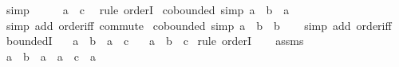\begin{isabellebody}
\ simp\isanewline
\ \ \isamarkupfalse%
\ \isamarkupfalse%
\ {\isachardoublequoteopen}a\ \isactrlbold {\isasymle}\ c{\isachardoublequoteclose}\ \isamarkupfalse%
\ {\isacharparenleft}{\kern0pt}rule\ orderI{\isacharparenright}{\kern0pt}\isanewline
{}\isamarkupfalse%
%
\endisatagproof
{\isafoldproof}%
%
\isadelimproof
\isanewline
%
\endisadelimproof
\isanewline
{}\isamarkupfalse%
\ cobounded{}\ {\isacharbrackleft}{\kern0pt}simp{\isacharbrackright}{\kern0pt}{\isacharcolon}{\kern0pt}\ {\isachardoublequoteopen}a\ \isactrlbold {\isacharasterisk}{\kern0pt}\ b\ \isactrlbold {\isasymle}\ a{\isachardoublequoteclose}\isanewline
%
\isadelimproof
\ \ %
\endisadelimproof
%
\isatagproof
{}\isamarkupfalse%
\ {\isacharparenleft}{\kern0pt}simp\ add{\isacharcolon}{\kern0pt}\ order{\isacharunderscore}{\kern0pt}iff\ commute{\isacharparenright}{\kern0pt}%
\endisatagproof
{\isafoldproof}%
%
\isadelimproof
\isanewline
%
\endisadelimproof
\isanewline
{}\isamarkupfalse%
\ cobounded{}\ {\isacharbrackleft}{\kern0pt}simp{\isacharbrackright}{\kern0pt}{\isacharcolon}{\kern0pt}\ {\isachardoublequoteopen}a\ \isactrlbold {\isacharasterisk}{\kern0pt}\ b\ \isactrlbold {\isasymle}\ b{\isachardoublequoteclose}\isanewline
%
\isadelimproof
\ \ %
\endisadelimproof
%
\isatagproof
{}\isamarkupfalse%
\ {\isacharparenleft}{\kern0pt}simp\ add{\isacharcolon}{\kern0pt}\ order{\isacharunderscore}{\kern0pt}iff{\isacharparenright}{\kern0pt}%
\endisatagproof
{\isafoldproof}%
%
\isadelimproof
\isanewline
%
\endisadelimproof
\isanewline
{}\isamarkupfalse%
\ boundedI{\isacharcolon}{\kern0pt}\isanewline
\ \ \ {\isachardoublequoteopen}a\ \isactrlbold {\isasymle}\ b{\isachardoublequoteclose}\ \ {\isachardoublequoteopen}a\ \isactrlbold {\isasymle}\ c{\isachardoublequoteclose}\isanewline
\ \ \ {\isachardoublequoteopen}a\ \isactrlbold {\isasymle}\ b\ \isactrlbold {\isacharasterisk}{\kern0pt}\ c{\isachardoublequoteclose}\isanewline
%
\isadelimproof
%
\endisadelimproof
%
\isatagproof
{}\isamarkupfalse%
\ {\isacharparenleft}{\kern0pt}rule\ orderI{\isacharparenright}{\kern0pt}\isanewline
\ \ \isamarkupfalse%
\ assms\ \isamarkupfalse%
\ {\isachardoublequoteopen}a\ \isactrlbold {\isacharasterisk}{\kern0pt}\ b\ {\isacharequal}{\kern0pt}\ a{\isachardoublequoteclose}\ \ {\isachardoublequoteopen}a\ \isactrlbold {\isacharasterisk}{\kern0pt}\ c\ {\isacharequal}{\kern0pt}\ a{\isachardoublequoteclose}\isanewline

\end{isabellebody}
